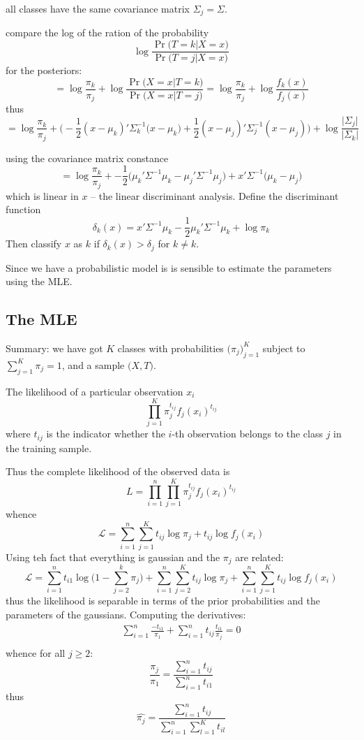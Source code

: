 \documentclass[a4paper]{article}
\begin{document}
all classes have the same covariance matrix $\Sigma_j = \Sigma$.

compare the log of the ration of the probability
\[\log \frac{\Pr\big(T=k\vert X=x\big)}{\Pr\big(T=j\vert X=x\big)} \]
for the posteriors:
\[ = \log \frac{\pi_k}{\pi_j} + \log \frac{\Pr\big(X=x\vert T=k\big)}{\Pr\big(X=x\vert T=j\big)} = \log \frac{\pi_k}{\pi_j} + \log \frac{f_k(x)}{f_j(x)} \]
thus
\[ = \log \frac{\pi_k}{\pi_j} + \Big( -\frac{1}{2}(x-\mu_k)'\Sigma_k^{-1}(x-\mu_k\Big) + \frac{1}{2}(x-\mu_j)'\Sigma_j^{-1}(x-\mu_j) \Big) + \log\frac{\lvert \Sigma_j\rvert}{\lvert \Sigma_k\rvert} \]

using the covariance matrix constance
\[ = \log \frac{\pi_k}{\pi_j} + -\frac{1}{2}\big(\mu_k'\Sigma^{-1}\mu_k - \mu_j'\Sigma^{-1}\mu_j \big) + x'\Sigma^{-1}\big( \mu_k - \mu_j\big) \]
which is linear in $x$ -- the linear discriminant analysis. Define the discriminant function
\[\delta_k(x) = x'\Sigma^{-1}\mu_k - \frac{1}{2} \mu_k'\Sigma^{-1}\mu_k + \log \pi_k\]
Then  classify $x$ as $k$ if $\delta_k(x)>\delta_j$ for $k\neq k$.

Since we have a probabilistic model is is sensible to estimate the parameters using the MLE.

\subsection{The MLE} %
\label{sub:the_mle}

Summary:
we have got $K$ classes with probabilities $\big(\pi_j\big)_{j=1}^K$ subject to $\sum_{j=1}^K \pi_j = 1$, and a sample $\big(X,T\big)$.


The likelihood of a particular observation $x_i$
\[\prod_{j=1}^K \pi_j^{t_{ij}} f_j(x_i)^{t_{ij}}\]
where $t_{ij}$ is the indicator whether the $i$-th observation belongs to the class $j$ in the training sample.

Thus the complete likelihood of the observed data is
\[L = \prod_{i=1}^n \prod_{j=1}^K \pi_j^{t_{ij}} f_j(x_i)^{t_{ij}}\]
whence
\[\mathcal{L} = \sum_{i=1}^n \sum_{j=1}^K t_{ij} \log \pi_j + t_{ij} \log f_j(x_i)\]
Using teh fact that everything is gaussian and the $\pi_j$ are related:
\[\mathcal{L} = \sum_{i=1}^n t_{i1} \log \big( 1- \sum_{j=2}^k\pi_j \big) +  \sum_{i=1}^n \sum_{j=2}^K t_{ij} \log \pi_j +  \sum_{i=1}^n \sum_{j=1}^K t_{ij} \log f_j(x_i)\]
thus the likelihood is separable in terms of the prior probabilities and the parameters of the gaussians.
Computing the derivatives:
\begin{align*}
	\sum_{i=1}^n \frac{-t_{i1}}{\pi_1} +  \sum_{i=1}^n t_{ij} \frac{t_{i1}}{\pi_j} = 0\\
\end{align*}
whence for all $j\geq 2$:
\[\frac{\pi_j}{\pi_1} = \frac{\sum_{i=1}^n t_{ij}}{\sum_{i=1}^n t_{i1}}\]
thus
\[\hat{\pi_j} = \frac{\sum_{i=1}^n t_{ij}}{\sum_{i=1}^n \sum_{l=1}^K t_{il}}\]
\end{document}
